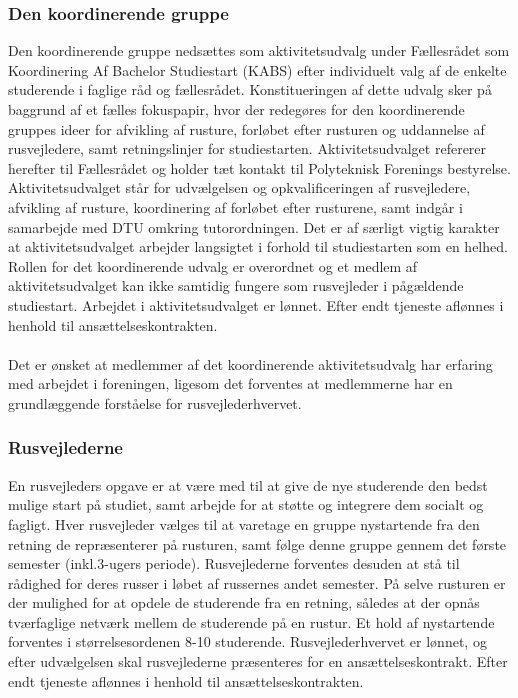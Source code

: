\subsubsection{Den koordinerende gruppe}
Den koordinerende gruppe nedsættes som aktivitetsudvalg under Fællesrådet som Koordinering Af Bachelor Studiestart (KABS) efter individuelt valg af de enkelte studerende i faglige råd og fællesrådet. Konstitueringen af dette udvalg sker på baggrund af et fælles fokuspapir, hvor der redegøres for den koordinerende gruppes ideer for afvikling af rusture, forløbet efter rusturen og uddannelse af rusvejledere, samt retningslinjer for studiestarten. Aktivitetsudvalget refererer herefter til Fællesrådet og holder tæt kontakt til Polyteknisk Forenings bestyrelse. Aktivitetsudvalget står for udvælgelsen og opkvalificeringen af rusvejledere, afvikling af rusture, koordinering af forløbet efter rusturene, samt indgår i samarbejde med DTU omkring tutorordningen. Det er af særligt vigtig karakter at aktivitetsudvalget arbejder langsigtet i forhold til studiestarten som en helhed. Rollen for det koordinerende udvalg er overordnet og et medlem af aktivitetsudvalget kan ikke samtidig fungere som rusvejleder i pågældende studiestart. Arbejdet i aktivitetsudvalget er lønnet. Efter endt tjeneste aflønnes i henhold til ansættelseskontrakten.\\
\\
Det er ønsket at medlemmer af det koordinerende aktivitetsudvalg har erfaring med arbejdet i foreningen, ligesom det forventes at medlemmerne har en grundlæggende forståelse for rusvejlederhvervet.

\subsubsection{Rusvejlederne}
En rusvejleders opgave er at være med til at give de nye studerende den bedst mulige start på studiet, samt arbejde for at støtte og integrere dem socialt og fagligt. Hver rusvejleder vælges til at varetage en gruppe nystartende fra den retning de repræsenterer på rusturen, samt følge denne gruppe gennem det første semester (inkl.3-ugers periode). Rusvejlederne forventes desuden at stå til rådighed for deres russer i løbet af russernes andet semester. På selve rusturen er der mulighed for at opdele de studerende fra en retning, således at der opnås tværfaglige netværk mellem de studerende på en rustur. Et hold af nystartende forventes i størrelsesordenen 8-10 studerende. Rusvejlederhvervet er lønnet, og efter udvælgelsen skal rusvejlederne præsenteres for en ansættelseskontrakt. Efter endt tjeneste aflønnes i henhold til ansættelseskontrakten.

